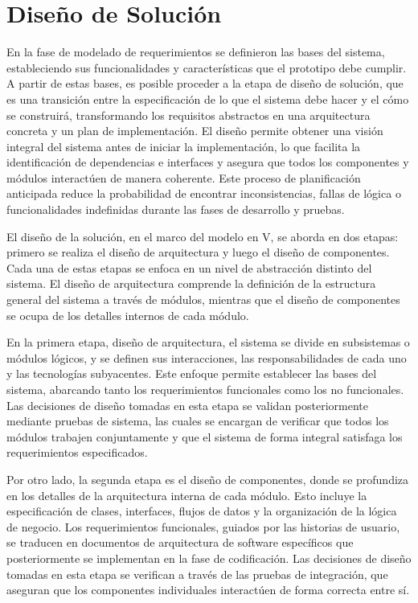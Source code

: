 \chapter[Diseño de Solución]{Diseño de Solución}
\label{cp:design}

\parindent0pt

En la fase de modelado de requerimientos se definieron las bases del sistema, estableciendo sus funcionalidades y características que el prototipo debe cumplir. A partir de estas bases, es posible proceder a la etapa de diseño de solución, que es una transición entre la especificación de lo que el sistema debe hacer y el cómo se construirá, transformando los requisitos abstractos en una arquitectura concreta y un plan de implementación. El diseño permite obtener una visión integral del sistema antes de iniciar la implementación, lo que facilita la identificación de dependencias e interfaces y asegura que todos los componentes y módulos interactúen de manera coherente. Este proceso de planificación anticipada reduce la probabilidad de encontrar inconsistencias, fallas de lógica o funcionalidades indefinidas durante las fases de desarrollo y pruebas.

El diseño de la solución, en el marco del modelo en V, se aborda en dos etapas: primero se realiza el diseño de arquitectura y luego el diseño de componentes. Cada una de estas etapas se enfoca en un nivel de abstracción distinto del sistema. El diseño de arquitectura comprende la definición de la estructura general del sistema a través de módulos, mientras que el diseño de componentes se ocupa de los detalles internos de cada módulo.

En la primera etapa, diseño de arquitectura, el sistema se divide en subsistemas o módulos lógicos, y se definen sus interacciones, las responsabilidades de cada uno y las tecnologías subyacentes. Este enfoque permite establecer las bases del sistema, abarcando tanto los requerimientos funcionales como los no funcionales. Las decisiones de diseño tomadas en esta etapa se validan posteriormente mediante pruebas de sistema, las cuales se encargan de verificar que todos los módulos trabajen conjuntamente y que el sistema de forma integral satisfaga los requerimientos especificados.

Por otro lado, la segunda etapa es el diseño de componentes, donde se profundiza en los detalles de la arquitectura interna de cada módulo. Esto incluye la especificación de clases, interfaces, flujos de datos y la organización de la lógica de negocio. Los requerimientos funcionales, guiados por las historias de usuario, se traducen en documentos de arquitectura de software específicos que posteriormente se implementan en la fase de codificación. Las decisiones de diseño tomadas en esta etapa se verifican a través de las pruebas de integración, que aseguran que los componentes individuales interactúen de forma correcta entre sí.

